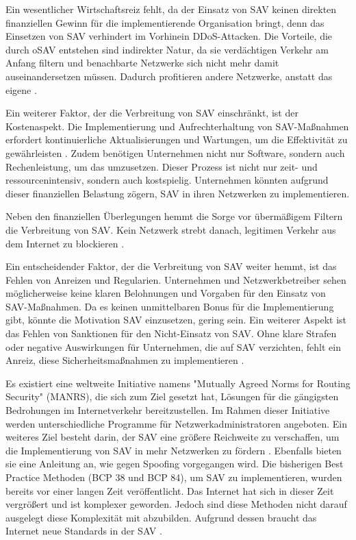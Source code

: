 \documentclass[sigplan,screen]{acmart}
\begin{document}
Ein wesentlicher Wirtschaftsreiz fehlt, da der Einsatz von SAV keinen direkten finanziellen Gewinn für die implementierende Organisation bringt, denn das Einsetzen von SAV verhindert im Vorhinein DDoS-Attacken. Die Vorteile, die durch oSAV entstehen sind indirekter Natur, da sie verdächtigen Verkehr am Anfang filtern und benachbarte Netzwerke sich nicht mehr damit auseinandersetzen müssen. Dadurch profitieren andere Netzwerke, anstatt das eigene \cite{CRP01}.

Ein weiterer Faktor, der die Verbreitung von SAV einschränkt, ist der Kostenaspekt. Die Implementierung und Aufrechterhaltung von SAV-Maßnahmen erfordert kontinuierliche Aktualisierungen und Wartungen, um die Effektivität zu gewährleisten \cite{Lone01}. Zudem benötigen Unternehmen nicht nur Software, sondern auch Rechenleistung, um das umzusetzen. Dieser Prozess ist nicht nur zeit- und ressourcenintensiv, sondern auch kostspielig. Unternehmen könnten aufgrund dieser finanziellen Belastung zögern, SAV in ihren Netzwerken zu implementieren.

Neben den finanziellen Überlegungen hemmt die Sorge vor übermäßigem Filtern die Verbreitung von SAV. Kein Netzwerk strebt danach, legitimen Verkehr aus dem Internet zu blockieren \cite{FrontDoor01}.

Ein entscheidender Faktor, der die Verbreitung von SAV weiter hemmt, ist das Fehlen von Anreizen und Regularien. Unternehmen und Netzwerkbetreiber sehen möglicherweise keine klaren Belohnungen und Vorgaben für den Einsatz von SAV-Maßnahmen. Da es keinen unmittelbaren Bonus für die Implementierung gibt, könnte die Motivation SAV einzusetzen, gering sein. Ein weiterer Aspekt ist das Fehlen von Sanktionen für den Nicht-Einsatz von SAV. Ohne klare Strafen oder negative Auswirkungen für Unternehmen, die auf SAV verzichten, fehlt ein Anreiz, diese Sicherheitsmaßnahmen zu implementieren \cite{Lone01}.

Es existiert eine weltweite Initiative namens "Mutually Agreed Norms for Routing Security" (MANRS), die sich zum Ziel gesetzt hat, Lösungen für die gängigsten Bedrohungen im Internetverkehr bereitzustellen. Im Rahmen dieser Initiative werden unterschiedliche Programme für Netzwerkadministratoren angeboten. Ein weiteres Ziel besteht darin, der SAV eine größere Reichweite zu verschaffen, um die Implementierung von SAV in mehr Netzwerken zu fördern \cite{manrs01}. Ebenfalls bieten sie eine Anleitung \cite{anti-spoofing01} an, wie gegen Spoofing vorgegangen wird.
Die bisherigen Best Practice Methoden (BCP 38 und BCP 84), um SAV zu implementieren, wurden bereits vor einer langen Zeit veröffentlicht. Das Internet hat sich in dieser Zeit vergrößert und ist komplexer geworden. Jedoch sind diese Methoden nicht darauf ausgelegt diese Komplexität mit abzubilden.  Aufgrund dessen braucht das Internet neue Standards in der SAV \cite{SAV_requirements01}.
\end{document}
